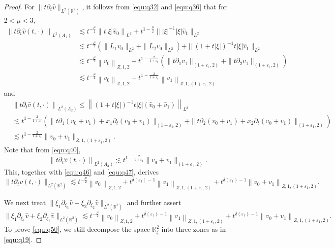 \documentclass[11pt,twoside]{article}
\newcommand{\R}{\mathbb R}
\newcommand{\p}{\partial}
\newcommand{\f}{\frac}
\theoremstyle{plain}
\theoremstyle{definition}
\theoremstyle{remark}
\numberwithin{equation}{section}
\begin{document}
\begin{proof}
For $\|t\p_t\hat{v}\|_{L^2(\R^2)}$, it follows from \eqref{equ:q32} and \eqref{equ:q36} that for $2<\mu<3$,
\begin{equation}\label{equ:q46}
\begin{aligned}
\left\|t\p_t\hat{v}(t, \cdot)\right\|_{L^2(A_1)}
& \lesssim t^{-\frac{\mu}{2}}\left\|t|\xi|\hat{v}_{0}\right\|_{L^{2}}+t^{1-\f{\mu}{2}} \||\xi|^{-1}|\xi|\hat{v}_{1}\|_{L^{2}}\\
& \lesssim t^{-\frac{\mu}{2}}(\|L_1v_0\|_{L^2}+\|L_2v_0\|_{L^2})+ \|(1+t|\xi|)^{-1}t|\xi|\hat{v}_{1}\|_{L^{2}}\\
& \lesssim t^{-\frac{\mu}{2}}\left\|v_{0}\right\|_{Z, 1, 2}+ t^{1-\f{2}{1+\varepsilon_1}}(\|t\p_1v_1\|_{(1+\varepsilon_1, 2)}+\|t\p_2v_1\|_{(1+\varepsilon_1, 2)}) \\
& \lesssim  t^{-\frac{\mu}{2}}\left\|v_{0}\right\|_{Z, 1, 2}+ t^{1-\f{2}{1+\varepsilon_1}}\left\|v_1\right\|_{Z, 1,(1+\varepsilon_1, 2)}
\end{aligned}
\end{equation}
and
\begin{equation}\label{equ:q47}
\begin{aligned}
&\left\|t\p_t\hat{v}(t, \cdot)\right\|_{L^2(A_2)}  \leq\left\|(1+t|\xi|)^{-1}t|\xi|(\hat{v}_{0}+\hat{v}_{1})\right\|_{L^{2}}\\
& \lesssim t^{1-\f{2}{1+\varepsilon_1}}(\|t\p_1(v_0+v_1)+x_1\p_t(v_0+v_1)\|_{(1+\varepsilon_1, 2)}+\|t\p_2(v_0+v_1)+x_2\p_t(v_0+v_1)\|_{(1+\varepsilon_1, 2)})\\
& \lesssim t^{1-\f{2}{1+\varepsilon_1}}\|v_0+v_1\|_{Z,1, (1+\varepsilon_1, 2)}.
\end{aligned}
\end{equation}
Note that from \eqref{equ:q40},
\begin{equation}\label{equ:q48}
\left\|t\p_t\hat{v}(t, \cdot)\right\|_{L^2(A_3)} \lesssim t^{1-\f{2}{1+\varepsilon_1}}\|v_0+v_1\|_{(1+\varepsilon_1, 2)}.
\end{equation}
This, together with \eqref{equ:q46} and \eqref{equ:q47}, derives
\begin{equation}\label{equ:q49}
\|t\p_tv(t, \cdot)\|_{L^2(\R^2)} \lesssim t^{-\f{\mu}{2}}\left\|v_0\right\|_{Z, 1, 2}
+t^{\delta(\varepsilon_1)-1}\left\|v_1\right\|_{Z, 1,(1+\varepsilon_1, 2)}
+t^{\delta(\varepsilon_1)-1}\left\|v_0+v_1\right\|_{Z, 1,(1+\varepsilon_1, 2)}.
\end{equation}


We next treat $\|\xi_1\p_{\xi_1}\hat{v}+\xi_2\p_{\xi_2}\hat{v}\|_{L^2(\R^2)}$
and further assert
\begin{equation}\label{equ:q50}
\|\xi_1\p_{\xi_1}\hat{v}+\xi_2\p_{\xi_2}\hat{v}\|_{L^2(\R^2)} \lesssim t^{-\f{\mu}{2}}\left\|v_0\right\|_{Z, 1, 2}+t^{\delta(\varepsilon_1)-1}\left\|v_1\right\|_{Z, 1,(1+\varepsilon_1, 2)}
+t^{\delta(\varepsilon_1)-1}\left\|v_0+v_1\right\|_{Z, 1,(1+\varepsilon_1, 2)}.
\end{equation}
To prove \eqref{equ:q50}, we still
decompose the space $\R_{\xi}^2$ into three zones as in \eqref{equ:q19}.


\end{proof}
\end{document}
